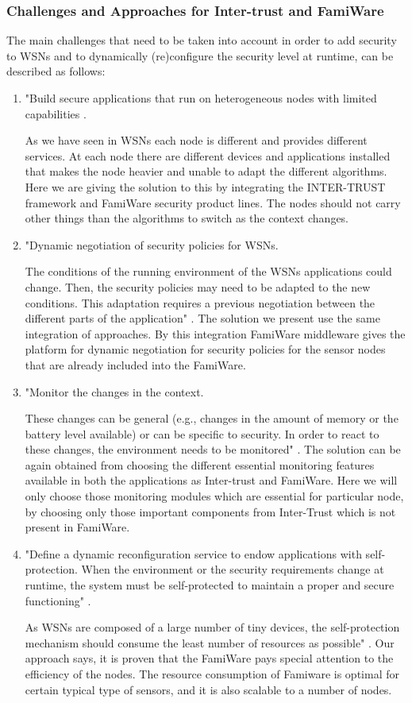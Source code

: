 \documentclass[12pt,a4paper,twoside]{report}
\begin{document}
\subsubsection{Challenges and Approaches for Inter-trust and FamiWare}
The main challenges that need to be taken into account in order to add security to WSNs and to dynamically (re)configure the security level at runtime, can be described as follows:
\begin{enumerate}
	\item  "Build secure applications that run on heterogeneous nodes with limited capabilities \cite{Pinto;etal:2013}.\par
As we have seen in WSNs each node is different and provides different services. At each node there are different devices and applications installed that makes the node heavier and unable to adapt the different algorithms. Here we are giving the solution to this by integrating the INTER-TRUST framework and FamiWare security product lines. The nodes should not carry other things than the algorithms to switch as the context changes.
	\item  "Dynamic negotiation of security policies for WSNs.\par
	The conditions of the running environment of the WSNs applications could change. Then, the security policies may need to be adapted to the new conditions. This adaptation requires a previous negotiation between the different parts of the application" \cite{Pinto;etal:2013}. The solution we present use the same integration of approaches. By this integration FamiWare middleware gives the platform for dynamic negotiation for security policies for the sensor nodes that are already included into the FamiWare.
	\item  "Monitor the changes in the context.\par
	These changes can be general (e.g., changes in the amount of memory or the battery level available) or can be specific to security. In order to react to these changes, the environment needs to be monitored" \cite{Pinto;etal:2013}. The solution can be again obtained from choosing the different essential monitoring features available in both the applications as Inter-trust and FamiWare. Here we will only choose those monitoring modules which are essential for particular node, by choosing only those important components from Inter-Trust which is not present in FamiWare.  
	\item "Define a dynamic reconfiguration service to endow applications with self-protection.
When the environment or the security requirements change at runtime, the system must be self-protected to maintain a proper and secure functioning" \cite{Pinto;etal:2013}. \par
As WSNs are composed of a large number of tiny devices, the self-protection mechanism should consume the least number of resources as possible" \cite{Pinto;etal:2013}. Our approach says, it is proven that the FamiWare pays special attention to the efficiency of the nodes. The resource consumption of Famiware is optimal for certain typical type of sensors, and it is also scalable to a number of nodes.
\end{enumerate}
\end{document}
